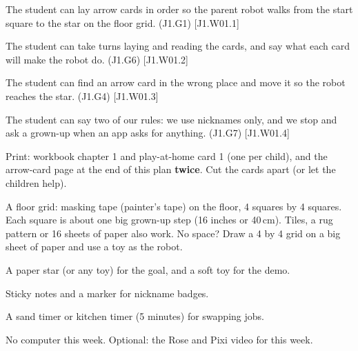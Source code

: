 
\begin{objectives}
  \item The student can lay arrow cards in order so the parent robot walks from the start square to the star on the floor grid. (J1.G1) [J1.W01.1]
  \item The student can take turns laying and reading the cards, and say what each card will make the robot do. (J1.G6) [J1.W01.2]
  \item The student can find an arrow card in the wrong place and move it so the robot reaches the star. (J1.G4) [J1.W01.3]
  \item The student can say two of our rules: we use nicknames only, and we stop and ask a grown-up when an app asks for anything. (J1.G7) [J1.W01.4]
\end{objectives}

\begin{materials}
  \item Print: workbook chapter 1 and play-at-home card 1 (one per child), and the arrow-card page at the end of this plan \textbf{twice}. Cut the cards apart (or let the children help).
  \item A floor grid: masking tape (painter's tape) on the floor, 4 squares by 4 squares. Each square is about one big grown-up step (16 inches or 40\,cm). Tiles, a rug pattern or 16 sheets of paper also work. No space? Draw a 4 by 4 grid on a big sheet of paper and use a toy as the robot.
  \item A paper star (or any toy) for the goal, and a soft toy for the demo.
  \item Sticky notes and a marker for nickname badges.
  \item A sand timer or kitchen timer (5 minutes) for swapping jobs.
  \item No computer this week. Optional: the Rose and Pixi video for this week.
\end{materials}

